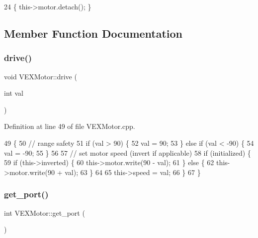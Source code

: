 \begin{DoxyCode}
24 \{ this->motor.detach(); \}
\end{DoxyCode}


\subsection{Member Function Documentation}
\mbox{\label{class_v_e_x_motor_ac8ab5c30e4be4a9e3ed290e7827bcf1a}} 
\subsubsection{\texorpdfstring{drive()}{drive()}}
{\footnotesize\ttfamily void V\+E\+X\+Motor\+::drive (\begin{DoxyParamCaption}\item[{int}]{val }\end{DoxyParamCaption})}



Definition at line 49 of file V\+E\+X\+Motor.\+cpp.


\begin{DoxyCode}
49                             \{
50     \textcolor{comment}{// range safety}
51     \textcolor{keywordflow}{if} (val > 90) \{
52         val = 90;
53     \} \textcolor{keywordflow}{else} \textcolor{keywordflow}{if} (val < -90) \{
54         val = -90;
55     \}
56 
57     \textcolor{comment}{// set motor speed (invert if applicable)}
58     \textcolor{keywordflow}{if} (initialized) \{
59         \textcolor{keywordflow}{if} (this->inverted) \{
60             this->motor.write(90 - val);
61         \} \textcolor{keywordflow}{else} \{
62             this->motor.write(90 + val);
63         \}
64 
65         this->speed = val;
66     \}
67 \}
\end{DoxyCode}
\mbox{\label{class_v_e_x_motor_a3f4844099f5aff566f26645fd20bf8b2}} 
\subsubsection{\texorpdfstring{get\+\_\+port()}{get\_port()}}
{\footnotesize\ttfamily int V\+E\+X\+Motor\+::get\+\_\+port (\begin{DoxyParamCaption}{ }\end{DoxyParamCaption})}



